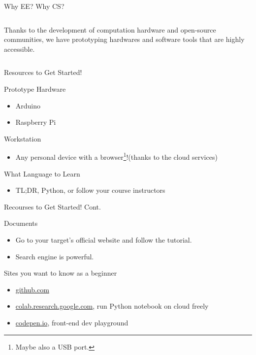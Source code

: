 \documentclass[aspectratio=169, 12pt]{beamer}
\begin{document}
\begin{frame}{Why EE? Why CS?}
    \begin{columns}
            \centering
            Thanks to the development of computation hardware and open-source communities, we have prototyping hardwares and software tools that are highly accessible.
    \end{columns}
\end{frame}



\begin{frame}{Resources to Get Started!}
\begin{block}{Prototype Hardware}
\begin{itemize}
\item Arduino
\item Raspberry Pi
\end{itemize}
\end{block}

\begin{block}{Workstation}
\begin{itemize}
\item Any personal device with a browser\footnote{\tiny Maybe also a USB port.}!(thanks to the cloud services)
\end{itemize}

\end{block}
\begin{block}{What Language to Learn}
\begin{itemize}
\item TL;DR, Python, or follow your course instructors
\end{itemize}
\end{block}
\end{frame}

\begin{frame}{Recourses to Get Started! Cont.}
\begin{block}{Documents}
\begin{itemize}
\item Go to your target's official website and follow the tutorial.
\item Search engine is powerful.
\end{itemize}
\end{block}

\begin{block}{Sites you want to know as a beginner}
\begin{itemize}
\item \url{github.com}
\item \url{colab.research.google.com}, run Python notebook on cloud freely
\item \url{codepen.io}, front-end dev playground
\end{itemize}
\end{block}
\end{frame}
\end{document}
